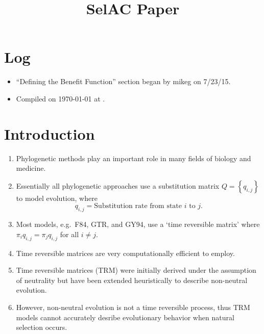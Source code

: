 \documentclass{article}
\title{SelAC Paper}
\date{}
\newcommand{\qij}{\ensuremath{q_{i,j}}\xspace}
\newcommand{\qji}{\ensuremath{q_{i,j}}\xspace}
\begin{document}
\maketitle
\section*{Log}
\begin{itemize}
\item ``Defining the Benefit Function'' section began by mikeg on 7/23/15.
\item Compiled on \today\xspace at \currenttime. 
\end{itemize}
\section*{Introduction}
\begin{enumerate}
\item Phylogenetic methods play an important role in many fields of biology and medicine.
\item Essentially all phylogenetic approaches use a substitution matrix $Q = \left\{\qij\right\}$  to model evolution, where
  \begin{equation*}
   \qij  = \text{Substitution rate from state $i$ to $j$.}
  \end{equation*}
\item Most models, e.g.~F84, GTR, and GY94, use a `time reversible matrix' where $\pi_i \qij = \pi_j \qji $ for all $i \neq j$.
\item Time reversible matrices are very computationally efficient to employ.
\item Time reversible matrices (TRM) were initially derived under the assumption of neutrality but have been extended heuristically to describe non-neutral evolution.
\item However, non-neutral evolution is not a time reversible process, thus TRM models cannot accurately desribe evolutionary behavior when natural selection occurs.
\end{enumerate}
\end{document}

